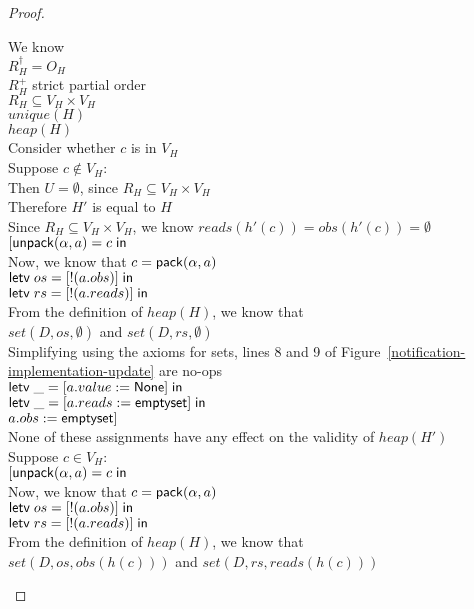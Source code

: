 \begin{proof}
\begin{tabbedproof}
\oo We know \\
\oox $R^\dagger_H = O_H$ \\
\oox $R^+_H$ strict partial order \\
\oox $R_H \subseteq V_H \times V_H$ \\
\oox $\mathit{unique}(H)$ \\
\oox $\mathit{heap}(H)$ \\
\ooo Consider whether $c$ is in $V_H$ \\
\ooo Suppose $c \not\in V_H$: \\
\oooo Then $U = \emptyset$, since $R_H \subseteq V_H \times V_H$ \\ 
\oooo Therefore $H'$ is equal to $H$ \\
\oooo Since $R_H \subseteq V_H \times V_H$, we know $\mathit{reads}(h'(c)) = \mathit{obs}(h'(c)) = \emptyset$ \\
\oooo $[\mathsf{unpack}({\alpha}, {a}) = {c} \;\mathsf{in}\;{}$ \\
\oooo Now, we know that $c = \mathsf{pack}({\alpha}, {a})$ \\
\oooo $\mathsf{letv}\;os = [!(a.obs)]\;\mathsf{in}\;$ \\
\oooo $\mathsf{letv}\;rs = [!(a.reads)]\;\mathsf{in}\;$ \\
\oooo From the definition of $\mathit{heap}(H)$, we know that  \\
\oooo $\mathit{set}(D, os, \emptyset)$ and $\mathit{set}(D, rs, \emptyset)$ \\
\oooo Simplifying using the axioms for sets, lines 8 and 9 of Figure~\ref{notification-implementation-update} are no-ops \\
\oooo $\mathsf{letv}\;\_ = [a.value := \mathsf{None}]\;\mathsf{in}\;$ \\
\oooo $\mathsf{letv}\;\_ = [a.reads := \mathsf{emptyset}]\;\mathsf{in}\;$ \\
\oooo $a.obs := \mathsf{emptyset}]$ \\
\oooo None of these assignments have any effect on the validity of $\mathit{heap}(H')$ \\
\ooo Suppose $c \in V_H$: \\
\oooo $[\mathsf{unpack}({\alpha}, {a}) = {c} \;\mathsf{in}\;{}$ \\
\oooo Now, we know that $c = \mathsf{pack}({\alpha}, {a})$ \\
\oooo $\mathsf{letv}\;os = [!(a.obs)]\;\mathsf{in}\;$ \\
\oooo $\mathsf{letv}\;rs = [!(a.reads)]\;\mathsf{in}\;$ \\
\oooo From the definition of $\mathit{heap}(H)$, we know that  \\
\oooo $\mathit{set}(D, os, \mathit{obs}(h(c)))$ and $\mathit{set}(D, rs, \mathit{reads}(h(c)))$ \\

\end{tabbedproof}
\end{proof}
